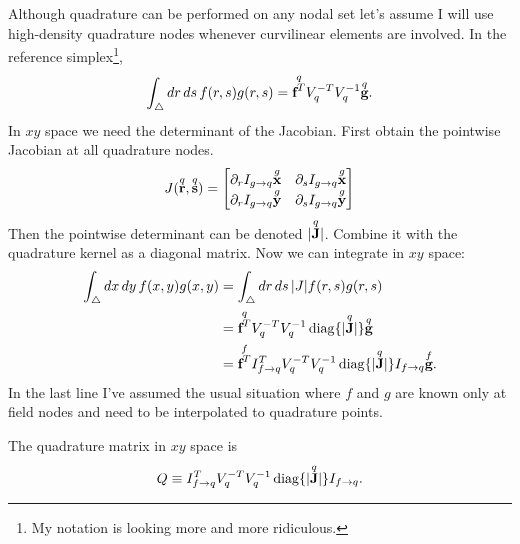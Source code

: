 Although quadrature can be performed on any nodal set let's assume I will use high-density quadrature nodes whenever curvilinear elements are involved.  In the reference simplex\footnote{My notation is looking more and more ridiculous.},
%
\begin{equation}
\int_\bigtriangleup dr\, ds\, f(r,s) g(r,s) = \overset{q}{\textbf{f}^T} V_q^{-T} V_q^{-1} \overset{q}{\textbf{g}}.
\end{equation}
%
In $xy$ space we need the determinant of the Jacobian.  First obtain the pointwise Jacobian at all quadrature nodes.
%
\begin{equation}
J(\overset{q}{\textbf{r}}, \overset{q}{\textbf{s}}) =
\begin{bmatrix}
\partial_r I_{g \rightarrow q} \overset{g}{\textbf{x}} & \partial_s I_{g \rightarrow q} \overset{g}{\textbf{x}} \\
\partial_r I_{g \rightarrow q} \overset{g}{\textbf{y}} & \partial_s I_{g \rightarrow q} \overset{g}{\textbf{y}}
\end{bmatrix}
\end{equation}
%
Then the pointwise determinant can be denoted $| \overset{q}{\textbf{J}} |$.  Combine it with the quadrature kernel as a diagonal matrix.  Now we can integrate in $xy$ space:
%
\begin{equation}
\begin{aligned}
\int_\bigtriangleup dx \, dy \, f(x,y) g(x,y) &= \int_\bigtriangleup dr \, ds \, |J| f(r,s) g(r,s) \\
&= \overset{q}{\textbf{f}^T} V_q^{-T} V_q^{-1} \operatorname{diag}\{| \overset{q}{\textbf{J}}|\} \overset{q}{\textbf{g}} \\
&= \overset{f}{\textbf{f}^T} I_{f \rightarrow q}^T V_q^{-T} V_q^{-1} \operatorname{diag}\{| \overset{q}{\textbf{J}}|\} I_{f \rightarrow q} \overset{f}{\textbf{g}}.
\end{aligned}
\end{equation}
%
In the last line I've assumed the usual situation where $f$ and $g$ are known only at field nodes and need to be interpolated to quadrature points.

The quadrature matrix in $xy$ space is
\begin{equation}
Q \equiv I_{f \rightarrow q}^T V_q^{-T} V_q^{-1} \operatorname{diag}\{| \overset{q}{\textbf{J}}|\} I_{f \rightarrow q}.
\end{equation}



